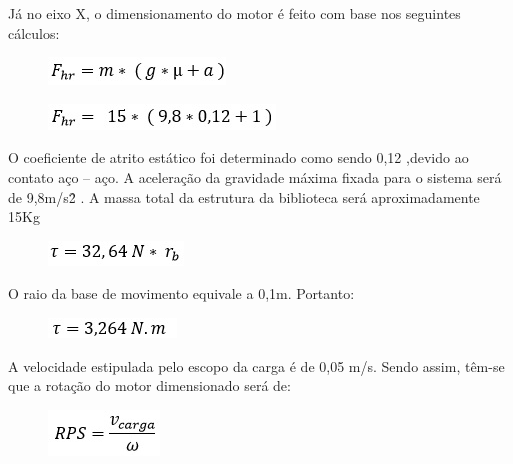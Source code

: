 Já no eixo X, o dimensionamento do motor é feito com base nos seguintes cálculos:

\begin{figure}[!h]
\centering
\includegraphics[scale=0.8, angle = 360]{figuras/formula1}
\caption[]{}
\end{figure}
\FloatBarrier

\begin{figure}[!h]
\centering
\includegraphics[scale=0.8, angle = 360]{figuras/formula2}
\caption[]{}
\end{figure}
\FloatBarrier

O coeficiente de atrito estático foi determinado como sendo 0,12 ,devido ao contato aço – aço. A aceleração da gravidade máxima fixada para o sistema será de 9,8m/s\^2 . A massa total da estrutura da biblioteca será aproximadamente 15Kg

\begin{figure}[!h]
\centering
\includegraphics[scale=0.8, angle = 360]{figuras/formula3}
\caption[]{}
\end{figure}
\FloatBarrier

O raio da base de movimento equivale a 0,1m. Portanto:

\begin{figure}[!h]
\centering
\includegraphics[scale=0.8, angle = 360]{figuras/formula4}
\caption[]{}
\end{figure}
\FloatBarrier

A velocidade estipulada pelo escopo da carga é de 0,05 m/s. Sendo assim, têm-se que a rotação do motor dimensionado será de:
 
\begin{figure}[!h]
\centering
\includegraphics[scale=0.8, angle = 360]{figuras/formula5}
\caption[]{}
\end{figure}
\FloatBarrier

